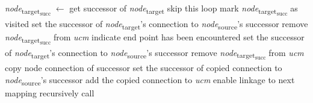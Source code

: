 \begin{algorithm}                     
	\begin{algorithmic}[1]
		
				\State \emph{node}\textsubscript{target\textsubscript{succ}} $\gets$ get successor of \emph{node}\textsubscript{target}
				 \label{alg:1.10}
					\State skip this loop
					\State mark \emph{node}\textsubscript{target\textsubscript{succ}} as visited
				\EndIf \label{alg:1.11}
				 \label{alg:1.12}
						\State set the successor of \emph{node}\textsubscript{target}'s connection to \emph{node}\textsubscript{source}'s successor
						\State remove \emph{node}\textsubscript{target\textsubscript{succ}} from \emph{ucm}
						\State indicate end point has been encountered
					\EndIf \label{alg:1.13}
				 \label{alg:1.14}
					\State set the successor of \emph{node}\textsubscript{target}'s connection to \emph{node}\textsubscript{source}'s successor
						\State remove \emph{node}\textsubscript{target\textsubscript{succ}} from \emph{ucm}
					\EndIf \label{alg:1.15}
				 \label{alg:1.16}
					\State copy node connection of successor
					\State set the successor of copied connection to \emph{node}\textsubscript{source}'s successor
					\State add the copied connection to \emph{ucm}
					\State enable linkage to next mapping \label{alg:1.17}
				\Else
					\State recursively call  \label{alg:1.18}
				\EndIf
			\EndFor
		\EndFunction
	\end{algorithmic}
\end{algorithm}

